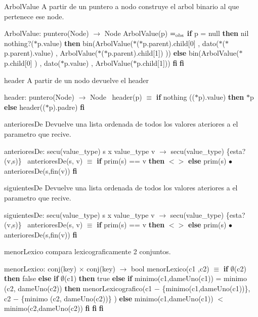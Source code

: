 \begin{DoxyParagraph}{Arbol\+Value}
A partir de un puntero a nodo construye el arbol binario al que pertenece ese node.

Arbol\+Value\+: puntero(\+Node) $\to$ Node Arbol\+Value(p) $=_{\rm obs}$ {\bfseries if} p = null {\bfseries then} nil  nothing?($\ast$p.value) {\bfseries then} bin(Arbol\+Value($\ast$($\ast$p.parent).child\mbox{[}0\mbox{]} , dato($\ast$($\ast$p.parent).value) , Arbol\+Value($\ast$($\ast$p.parent).child\mbox{[}1\mbox{]}) )) {\bfseries else} bin(Arbol\+Value($\ast$p.child\mbox{[}0\mbox{]} ) , dato($\ast$p.value) , Arbol\+Value($\ast$p.child\mbox{[}1\mbox{]})) {\bfseries fi} {\bfseries fi} 
\end{DoxyParagraph}


\begin{DoxyParagraph}{header}
A partir de un nodo devuelve el header

header\+: puntero(\+Node) $\to$ Node~\newline
 header(p) $\equiv$ {\bfseries if} nothing (($\ast$p).value) {\bfseries then} $\ast$p {\bfseries else} header(($\ast$p).padre) {\bfseries fi} 
\end{DoxyParagraph}


\begin{DoxyParagraph}{anteriores\+De}
Devuelve una lista ordenada de todos los valores ateriores a el parametro que recive.

anteriores\+De\+: secu(value\+\_\+type) s x value\+\_\+type v $\to$ secu(value\+\_\+type) \{esta?(v,s)\}~\newline
 anteriores\+De(s, v) $\equiv$ {\bfseries if} prim(s) == v {\bfseries then} $<$$>$ {\bfseries else} prim(s) $\bullet$ anteriores\+De(s,fin(v)) {\bfseries fi} 
\end{DoxyParagraph}


\begin{DoxyParagraph}{siguientes\+De}
Devuelve una lista ordenada de todos los valores ateriores a el parametro que recive.

siguientes\+De\+: secu(value\+\_\+type) s x value\+\_\+type v $\to$ secu(value\+\_\+type) \{esta?(v,s)\}~\newline
 anteriores\+De(s, v) $\equiv$ {\bfseries if} prim(s) == v {\bfseries then} $<$$>$ {\bfseries else} prim(s) $\bullet$ anteriores\+De(s,fin(v)) {\bfseries fi} 
\end{DoxyParagraph}


\begin{DoxyParagraph}{menor\+Lexico}
compara lexicograficamente 2 conjuntos.

menor\+Lexico\+: conj(key) $\times$ conj(key) $\to$ bool menor\+Lexico(c1 ,c2) $\equiv$ {\bfseries if} $\emptyset$(c2) {\bfseries then} false {\bfseries else} {\bfseries if} $\emptyset$(c1) {\bfseries then} true {\bfseries else} {\bfseries if} minimo(c1,dame\+Uno(c1)) = minimo (c2, dame\+Uno(c2)) {\bfseries then} menor\+Lexicografico(c1 $-$ \{minimo(c1,dame\+Uno(c1))\}, c2 $-$ \{minimo (c2, dame\+Uno(c2))\} ) {\bfseries else} minimo(c1,dame\+Uno(c1)) $<$ minimo(c2,dame\+Uno(c2)) {\bfseries fi} {\bfseries fi} {\bfseries fi} 
\end{DoxyParagraph}


